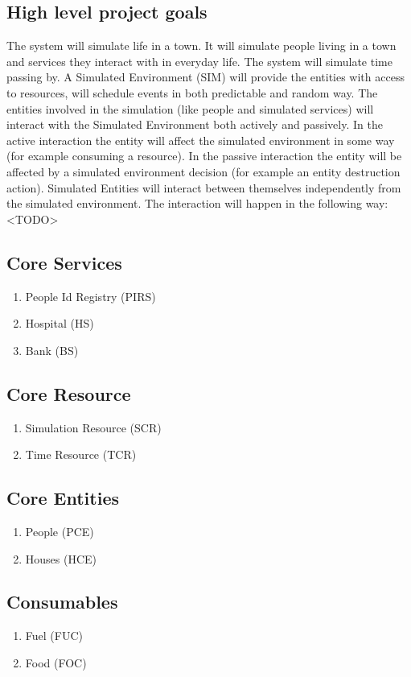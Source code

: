 \subsection{High level project goals} 
The system will simulate life in a town. It will simulate people living in a town and services they interact with in everyday life. 
The system will simulate time passing by. A Simulated Environment (SIM) will provide the entities with access to resources, will schedule events in both predictable and random way.
The entities involved in the simulation (like people and simulated services) will interact with the Simulated Environment both actively and passively. 
In the active interaction the entity will affect the simulated environment in some way (for example consuming a resource). 
In the passive interaction the entity will be affected by a simulated environment decision (for example an entity destruction action).
Simulated Entities will interact between themselves independently from the simulated environment. The interaction will happen in the following way: <TODO>

\subsection{Core Services} 
\begin{enumerate}
\item People Id Registry (PIRS)
\item Hospital (HS)
\item Bank (BS)
\end{enumerate}

\subsection{Core Resource} 
\begin{enumerate}
\item Simulation Resource (SCR)
\item Time Resource (TCR)
\end{enumerate}

\subsection{Core Entities} 
\begin{enumerate}
\item People (PCE)
\item Houses (HCE)
\end{enumerate}

\subsection{Consumables} 
\begin{enumerate}
\item Fuel (FUC)
\item Food (FOC)
\end{enumerate}

